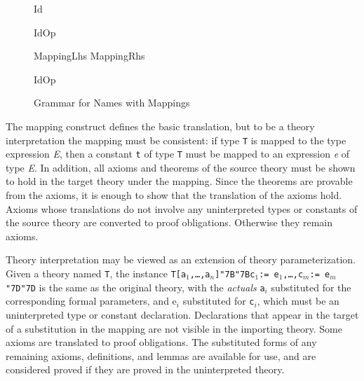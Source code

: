 \documentclass[11pt,twoside,openright,titlepage]{cslreport}
\def\mapb{\char"7B\char"7B}
\def\mape{\char"7D\char"7D}
\begin{document}
\begin{figure}
\setlength{\sessionboxwidth}{\linewidth}
\addtolength{\sessionboxwidth}{-\arrayrulewidth}
\addtolength{\sessionboxwidth}{-\tabcolsep}
\begin{boxedminipage}[b]{\sessionboxwidth}
\begin{bnf}

{ Id  }

{ IdOp   }

{\lit{\mapb{}}  \lit{\mape{}}}

{MappingLhs MappingRhs}

{IdOp  }

{\lit{:=} }

\end{bnf}
\end{boxedminipage}
\caption{Grammar for Names with Mappings}\label{mapping-bnf}
\end{figure}

The mapping construct defines the basic translation, but to be a theory
interpretation the mapping must be consistent: if type \texttt{T} is
mapped to the type expression \emph{E}, then a constant \texttt{t} of type
\texttt{T} must be mapped to an expression \emph{e} of type \emph{E}.  In
addition, all axioms and theorems of the source theory must be shown to
hold in the target theory under the mapping.  Since the theorems are
provable from the axioms, it is enough to show that the translation of the
axioms hold.  Axioms whose translations do not involve any
uninterpreted types or constants of the source theory are converted to
proof obligations.  Otherwise they remain axioms.

Theory interpretation may be viewed as an extension of theory
parameterization.  Given a theory named \texttt{T}, the instance
\texttt{T[a$_1$,\ldots,a$_n$]\mapb{}c$_1$:= e$_1$,\ldots,c$_m$:=
e$_m$\mape{}} is the same as the original theory, with the \emph{actuals}
\texttt{a$_i$} substituted for the corresponding formal parameters, and
e$_i$ substituted for \texttt{c$_i$}, which must be an uninterpreted type
or constant declaration.  Declarations that appear in the target of a
substitution in the mapping are not visible in the importing theory.  Some
axioms are translated to proof obligations.  The substituted forms of any
remaining axioms, definitions, and lemmas are available for use, and are
considered proved if they are proved in the uninterpreted theory.
\end{document}
